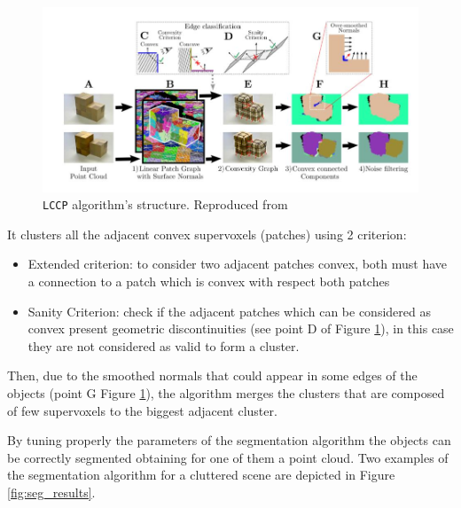 \begin{figure}[h]
\centering
\includegraphics[width=\textwidth]{Img/ObjectSegmentation/lccp_structure.jpg}
\caption{\texttt{LCCP} algorithm's structure. Reproduced from \citep{LCCP}}
\label{img:LCCP_structure}
\end{figure}

It clusters all the adjacent convex supervoxels (patches) using 2 criterion:
\begin{itemize}
\item Extended criterion: to consider two adjacent patches convex, both must have a connection to a patch which is convex with respect both patches
\item Sanity Criterion: check if the adjacent patches which can be considered as convex present geometric discontinuities (see point D of Figure \ref{img:LCCP_structure}), in this case they are not considered as valid to form a cluster.
\end{itemize}
Then, due to the smoothed normals that could appear in some edges of the objects (point G Figure \ref{img:LCCP_structure}), the algorithm merges the clusters that are composed of few supervoxels to the biggest adjacent cluster. 

By tuning properly the parameters of the segmentation algorithm the objects can be correctly segmented obtaining for one of them a point cloud. Two examples of the segmentation algorithm for a cluttered scene are depicted in Figure \ref{fig:seg_results}. 

